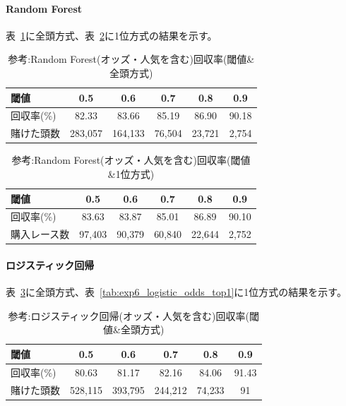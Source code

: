 \documentclass[dvipdfmx, a4paper, 11pt, titlepage]{jsarticle}
\begin{document}
\paragraph{Random Forest}

表~\ref{tab:exp6_rf_odds_all}に全頭方式、表~\ref{tab:exp6_rf_odds_top1}に1位方式の結果を示す。

\begin{table}[H]
  \centering
  \caption{参考:Random Forest(オッズ・人気を含む)回収率(閾値\&全頭方式)}
  \label{tab:exp6_rf_odds_all}
  \begin{tabular}{lccccc}
    \toprule
    閾値 & 0.5 & 0.6 & 0.7 & 0.8 & 0.9 \\
    \midrule
    回収率(\%)   & 82.33 & 83.66 & 85.19 & 86.90 & 90.18 \\
    賭けた頭数   & 283{,}057 & 164{,}133 & 76{,}504 & 23{,}721 & 2{,}754 \\
    \bottomrule
  \end{tabular}
\end{table}

\begin{table}[H]
  \centering
  \caption{参考:Random Forest(オッズ・人気を含む)回収率(閾値\&1位方式)}
  \label{tab:exp6_rf_odds_top1}
  \begin{tabular}{lccccc}
    \toprule
    閾値 & 0.5 & 0.6 & 0.7 & 0.8 & 0.9 \\
    \midrule
    回収率(\%)     & 83.63 & 83.87 & 85.01 & 86.89 & 90.10 \\
    購入レース数   & 97{,}403 & 90{,}379 & 60{,}840 & 22{,}644 & 2{,}752 \\
    \bottomrule
  \end{tabular}
\end{table}

\paragraph{ロジスティック回帰}

表~\ref{tab:exp6_logistic_odds_all}に全頭方式、表~\ref{tab:exp6_logistic_odds_top1}に1位方式の結果を示す。

\begin{table}[H]
  \centering
  \caption{参考:ロジスティック回帰(オッズ・人気を含む)回収率(閾値\&全頭方式)}
  \label{tab:exp6_logistic_odds_all}
  \begin{tabular}{lccccc}
    \toprule
    閾値 & 0.5 & 0.6 & 0.7 & 0.8 & 0.9 \\
    \midrule
    回収率(\%)   & 80.63 & 81.17 & 82.16 & 84.06 & 91.43 \\
    賭けた頭数   & 528{,}115 & 393{,}795 & 244{,}212 & 74{,}233 & 91 \\
    \bottomrule
  \end{tabular}
\end{table}
\end{document}
